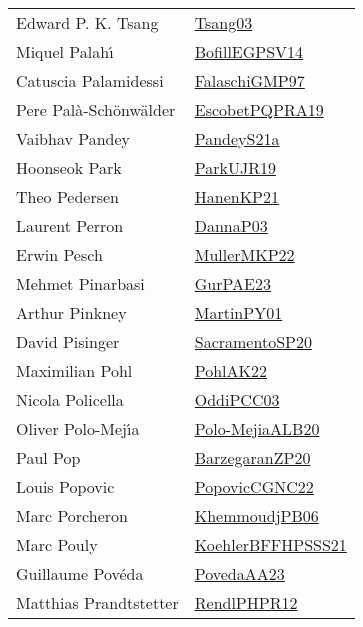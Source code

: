 {\begin{longtable}{p{4cm}p{20cm}}
Edward P. K. Tsang & \href{articles/Tsang03.pdf}{Tsang03}\cite{Tsang03} \\
Miquel Palah{\'{\i}} & \href{papers/BofillEGPSV14.pdf}{BofillEGPSV14}\cite{BofillEGPSV14} \\
Catuscia Palamidessi & \href{articles/FalaschiGMP97.pdf}{FalaschiGMP97}\cite{FalaschiGMP97} \\
Pere Pal{\`{a}}{-}Sch{\"{o}}nw{\"{a}}lder & \href{articles/EscobetPQPRA19.pdf}{EscobetPQPRA19}\cite{EscobetPQPRA19} \\
Vaibhav Pandey & \href{articles/PandeyS21a.pdf}{PandeyS21a}\cite{PandeyS21a} \\
Hoonseok Park & \href{papers/ParkUJR19.pdf}{ParkUJR19}\cite{ParkUJR19} \\
Theo Pedersen & \href{papers/HanenKP21.pdf}{HanenKP21}\cite{HanenKP21} \\
Laurent Perron & \href{papers/DannaP03.pdf}{DannaP03}\cite{DannaP03} \\
Erwin Pesch & \href{articles/MullerMKP22.pdf}{MullerMKP22}\cite{MullerMKP22} \\
Mehmet Pinarbasi & \href{articles/GurPAE23.pdf}{GurPAE23}\cite{GurPAE23} \\
Arthur Pinkney & \href{articles/MartinPY01.pdf}{MartinPY01}\cite{MartinPY01} \\
David Pisinger & \href{articles/SacramentoSP20.pdf}{SacramentoSP20}\cite{SacramentoSP20} \\
Maximilian Pohl & \href{articles/PohlAK22.pdf}{PohlAK22}\cite{PohlAK22} \\
Nicola Policella & \href{papers/OddiPCC03.pdf}{OddiPCC03}\cite{OddiPCC03} \\
Oliver Polo{-}Mej{\'{\i}}a & \href{}{Polo-MejiaALB20}\cite{Polo-MejiaALB20} \\
Paul Pop & \href{papers/BarzegaranZP20.pdf}{BarzegaranZP20}\cite{BarzegaranZP20} \\
Louis Popovic & \href{papers/PopovicCGNC22.pdf}{PopovicCGNC22}\cite{PopovicCGNC22} \\
Marc Porcheron & \href{papers/KhemmoudjPB06.pdf}{KhemmoudjPB06}\cite{KhemmoudjPB06} \\
Marc Pouly & \href{articles/KoehlerBFFHPSSS21.pdf}{KoehlerBFFHPSSS21}\cite{KoehlerBFFHPSSS21} \\
Guillaume Pov{\'{e}}da & \href{papers/PovedaAA23.pdf}{PovedaAA23}\cite{PovedaAA23} \\
Matthias Prandtstetter & \href{papers/RendlPHPR12.pdf}{RendlPHPR12}\cite{RendlPHPR12} \\

\end{longtable}}
